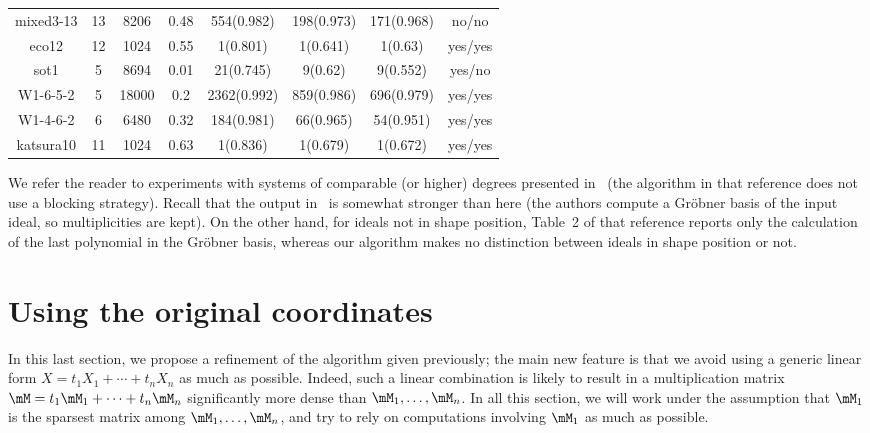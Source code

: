 \documentclass[12pt]{article}
\newcommand{\lf}{X}
\begin{document}
\begin{table}[H]
\begin{tabular}{c|c|c|c|c|c|c|c}
mixed3-13&13&8206&0.48&554(0.982) & 198(0.973) & 171(0.968)   &no/no\\
eco12 &12 & 1024 & 0.55 & 1(0.801) & 1(0.641) & 1(0.63) & yes/yes  \\
sot1 &5 & 8694 & 0.01 & 21(0.745) & 9(0.62) & 9(0.552) & yes/no \\
W1-6-5-2 & 5 & 18000 & 0.2 & 2362(0.992) & 859(0.986) & 696(0.979)& yes/yes  \\
W1-4-6-2 & 6 & 6480 & 0.32 & 184(0.981) & 66(0.965) & 54(0.951)& yes/yes  \\
katsura10 &11 & 1024 & 0.63 & 1(0.836) & 1(0.679) & 1(0.672)  & yes/yes
	\end{tabular}
\end{table}

We refer the reader to experiments with systems of comparable (or
higher) degrees presented in~\cite{FaMo17} (the algorithm in that
reference does not use a blocking strategy). Recall that the output
in~\cite{FaMo17} is somewhat stronger than here (the authors compute a
Gr\"obner basis of the input ideal, so multiplicities are kept). On
the other hand, for ideals not in shape position, Table~2 of that
reference reports only the calculation of the last polynomial in the
Gr\"obner basis, whereas our algorithm makes no distinction between
ideals in shape position or not.



\section{Using the original coordinates}\label{sec:original}

In this last section, we propose a refinement of the algorithm given
previously; the main new feature is that we avoid using a generic
linear form $\lf = t_1 X_1 + \cdots + t_n X_n$ as much as possible.
Indeed, such a linear combination is likely to result in a
multiplication matrix $\mM = t_1 \mM_1 + \cdots + t_n \mM_n$
significantly more dense than $\mM_1,\dots,\mM_n$. In all this
section, we will work under the assumption that $\mM_1$ is the sparsest
matrix among $\mM_1,\dots,\mM_n$, and try to rely on computations
involving $\mM_1$ as much as possible.
\end{document}
